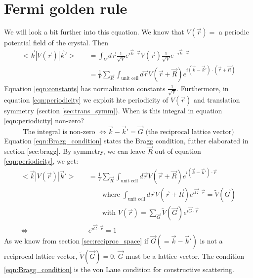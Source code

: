 \section{Fermi golden rule} \label{sec:fermi}
We will look a bit further into this equation. We know that $V(\vec{r})=$ a periodic potential field of the crystal. Then
\begin{align}
	<\vec{k}|V(\vec{r})|\vec{k}'> \quad &= \int_{V}^{}d\vec{r}\frac{1}{\sqrt{V}}e^{i\vec{k}\cdot\vec{r}}V(\vec{r})\frac{1}{\sqrt{V}}e^{-i\vec{k}\cdot\vec{r}} \label{eqn:constants}\\
	&= \frac{1}{V}\sum_{\vec{R}}^{}\int_{\text{unit cell}}^{}d\vec{r}V(\vec{r}+\vec{R})e^{i(\vec{k}-\vec{k}')\cdot(\vec{r}+\vec{R})} \label{eqn:periodicity}
\end{align}
Equation \ref{eqn:constants} has normalization constants $\frac{1}{\sqrt{V}}$. Furthermore, in equation \ref{eqn:periodicity} we exploit hte periodicity of $V(\vec{r})$ and translation symmetry (section \ref{sec:trans_symm}). When is this integral in equation \ref{eqn:periodicity} non-zero?
\begin{equation}
	\text{The integral is non-zero } \iff \vec{k} - \vec{k}' = \vec{G} \text{ (the reciprocal lattice vector)} \label{eqn:Bragg_condition}
\end{equation}
Equation \ref{eqn:Bragg_condition} states the Bragg condition, futher elaborated in section \ref{sec:bragg}. By symmetry, we can leave $\vec{R}$ out of equation \ref{eqn:periodicity}, we get:
\begin{align}
	<\vec{k}|V(\vec{r})|\vec{k}'> \quad &= \frac{1}{V}\sum_{\vec{R}}^{}\int_{\text{unit cell}}^{}d\vec{r}V(\vec{r}+\vec{R})e^{i(\vec{k}-\vec{k}')\cdot\vec{r}}\\
	&\qquad\text{where } \int_{\text{unit cell}}^{}d\vec{r}V(\vec{r}+\vec{R})e^{i\vec{G}\cdot\vec{r}} = \tilde{V}(\vec{G})\\
	&\qquad\text{with } V(\vec{r}) = \sum_{\vec{G}}^{}\tilde{V}(\vec{G})e^{i\vec{G}\cdot\vec{r}}\\
	\iff & e^{i\vec{G}\cdot\vec{r}} = 1
\end{align}
As we know from section \ref{sec:reciproc_space} if $\vec{G} (= \vec{k} - \vec{k}')$ is not a reciprocal lattice vector, $\tilde{V}(\vec{G}) = 0$. $\vec{G}$ must be a lattice vector. The condition \ref{eqn:Bragg_condition} is the von Laue condition for constructive scattering.\par
